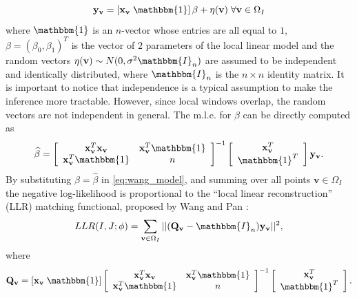 \begin{equation}\label{eq:wang_model}
    \mathbf{y}_{\mathbf{v}} = \left[\mathbf{x}_{\mathbf{v}} \; \mathbbm{1}\right]\beta + \eta(\mathbf{v}) \; \forall \mathbf{v}\in\Omega_{I}
\end{equation}
where $\mathbbm{1}$ is an $n$-vector whose entries are all equal to $1$,  $\beta = (\beta_{0}, \beta_{1})^{T}$ is the vector of $2$ parameters of the local linear model and the random vectors $\eta(\mathbf{v})\sim N(0, \sigma^{2} \mathbbm{I}_{n})$ are assumed to be independent and identically distributed, where $\mathbbm{I}_{n}$ is the $n \times n$ identity matrix. It is important to notice that independence is a typical assumption to make the inference more tractable. However, since local windows overlap, the random vectors are not independent in general. The m.l.e. for $\beta$ can be directly computed as
\begin{equation}\label{eq:wang_model_mle_beta}
    \widehat{\beta} =
    \left[\begin{array}{cc}
        \mathbf{x}_{\mathbf{v}}^{T}\mathbf{x}_{\mathbf{v}} & \mathbf{x}_{\mathbf{v}}^{T}\mathbbm{1}\\
        \mathbf{x}_{\mathbf{v}}^{T}\mathbbm{1} & n
    \end{array}\right]^{-1}
    \left[\begin{array}{c}
        \mathbf{x}_{\mathbf{v}}^{T}\\
        \mathbbm{1}^{T}
    \end{array}\right]\mathbf{y}_{\mathbf{v}}.
\end{equation}
By substituting $\beta = \widehat{\beta}$ in \eqref{eq:wang_model}, and summing over all points $\mathbf{v} \in\Omega_{I}$ the negative log-likelihood is proportional to the ``local linear reconstruction'' (LLR) matching functional, proposed by Wang and Pan \cite{Wang2014}:
\begin{equation}\label{eq:wang_metric}
    LLR(I, J;\phi) = \sum_{\mathbf{v} \in\Omega_{I}}|| (\mathbf{Q}_{\mathbf{v}} - \mathbbm{I}_{n})\mathbf{y}_{\mathbf{v}}||^{2},
\end{equation}
\vspace{-0.2cm}
where
\vspace{-0.2cm}
\begin{equation}\label{eq:def_P_v}
    \mathbf{Q_v} = [\mathbf{x}_{\mathbf{v}} \; \mathbbm{1}]
    \left[\begin{array}{cc}
        \mathbf{x}_{\mathbf{v}}^{T}\mathbf{x}_{\mathbf{v}} & \mathbf{x}_{\mathbf{v}}^{T}\mathbbm{1}\\
        \mathbf{x}_{\mathbf{v}}^{T}\mathbbm{1} & n
    \end{array}\right]^{-1}
    \left[\begin{array}{c}
        \mathbf{x}_{\mathbf{v}}^{T}\\
        \mathbbm{1}^{T}
    \end{array}\right].
\end{equation}

